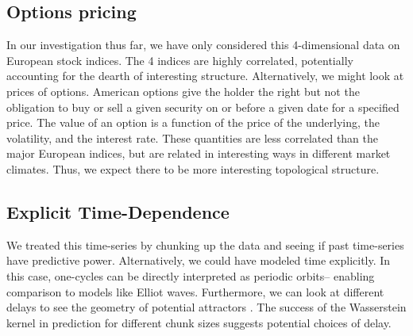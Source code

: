 \documentclass{article}
\begin{document}
\subsection{Options pricing}
In our investigation thus far, we have only considered this 4-dimensional data on European stock indices. The 4 indices are highly correlated, potentially accounting for the dearth of interesting structure. Alternatively, we might look at prices of options. American options give the holder the right but not the obligation to buy or sell a given security on or before a given date for a specified price. The value of an option is a function of the price of the underlying, the volatility, and the interest rate. These quantities are less correlated than the major  European indices, but are related in interesting ways in different market climates. Thus, we expect there to be more interesting topological structure.

\subsection{Explicit Time-Dependence}
We treated this time-series by chunking up the data and seeing if past time-series have predictive power. Alternatively, we could have modeled time explicitly. In this case, one-cycles can be directly interpreted as periodic orbits-- enabling comparison to models like Elliot waves. Furthermore, we can look at different delays to see the geometry of potential attractors \cite{muldoon1993}. The success of the Wasserstein kernel in prediction for different chunk sizes suggests potential choices of delay.

\newpage

\nocite{*}


\end{document}
